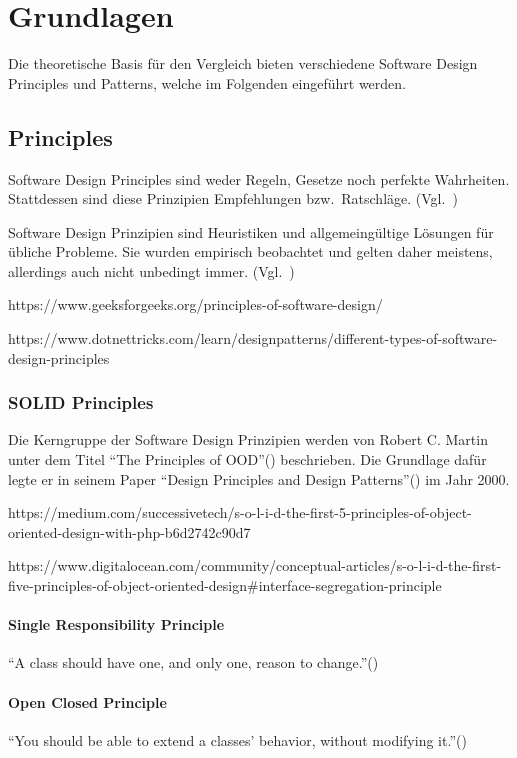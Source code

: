 \section{Grundlagen}
Die theoretische Basis für den Vergleich bieten verschiedene Software Design Principles und Patterns, welche
im Folgenden eingeführt werden.

\subsection{Principles}
Software Design Principles sind weder Regeln, Gesetze noch perfekte Wahrheiten.
Stattdessen sind diese Prinzipien Empfehlungen bzw.\ Ratschläge.
(Vgl.~\cite{getting-a-solid-start})

Software Design Prinzipien sind Heuristiken und allgemeingültige Lösungen für übliche Probleme.
Sie wurden empirisch beobachtet und gelten daher meistens, allerdings auch nicht unbedingt immer.
(Vgl.~\cite{getting-a-solid-start})

https://www.geeksforgeeks.org/principles-of-software-design/

https://www.dotnettricks.com/learn/designpatterns/different-types-of-software-design-principles

\subsubsection{SOLID Principles}
Die Kerngruppe der Software Design Prinzipien werden von Robert C. Martin unter dem Titel \enquote{The Principles of OOD}(\cite{solid}) beschrieben.
Die Grundlage dafür legte er in seinem Paper \enquote{Design Principles and Design Patterns}(\cite{design-principles-and-design-patterns}) im Jahr 2000.

https://medium.com/successivetech/s-o-l-i-d-the-first-5-principles-of-object-oriented-design-with-php-b6d2742c90d7

https://www.digitalocean.com/community/conceptual-articles/s-o-l-i-d-the-first-five-principles-of-object-oriented-design#interface-segregation-principle

\paragraph{Single Responsibility Principle}
\enquote{A class should have one, and only one, reason to change.}(\cite{solid})

\paragraph{Open Closed Principle}
\enquote{You should be able to extend a classes' behavior, without modifying it.}(\cite{solid})


